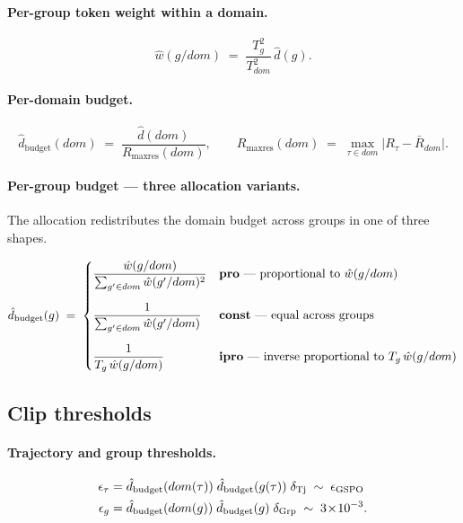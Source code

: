 \documentclass[11pt]{article}
\newcommand{\dbudget}{\hat d_{\text{budget}}}
\begin{document}
\paragraph{Per-group token weight within a domain.}
\[
\hat w(g/dom) \;=\; \frac{T_g^{2}}{T_{dom}^{2}}\,\hat d(g).
\]

\paragraph{Per-domain budget.}
\[
\dbudget(dom) \;=\; \frac{\hat d(dom)}{R_{\max\text{res}}(dom)},
\qquad
R_{\max\text{res}}(dom) \;=\; \max_{\tau\in dom}\bigl|R_\tau - \bar R_{dom}\bigr|.
\]

\paragraph{Per-group budget --- three allocation variants.}
The allocation redistributes the domain budget across groups in one of
three shapes.

\begin{equation}
\dbudget(g) \;=\;
\begin{dcases}
\dfrac{\hat w(g/dom)}{\sum_{g'\in dom}\hat w(g'/dom)^{2}}
  & \text{\textbf{pro} --- proportional to $\hat w(g/dom)$} \\[6pt]
\dfrac{1}{\sum_{g'\in dom}\hat w(g'/dom)}
  & \text{\textbf{const} --- equal across groups} \\[6pt]
\dfrac{1}{T_g\,\hat w(g/dom)}
  & \text{\textbf{ipro} --- inverse proportional to $T_g\,\hat w(g/dom)$}
\end{dcases}
\label{eq:dbudget-g}
\end{equation}

\subsection{Clip thresholds}

\paragraph{Trajectory and group thresholds.}
\begin{align}
\epsilon_\tau &= \dbudget(dom(\tau))\;\dbudget(g(\tau))\;\delta_{\rm Tj}
                    \;\sim\; \epsilon_{\rm GSPO}
                    \label{eq:eps-tau} \\
\epsilon_g    &= \dbudget(dom(g))\;\dbudget(g)\;\delta_{\rm Grp}
                    \;\sim\; 3\!\times\!10^{-3}.
                    \label{eq:eps-g}
\end{align}
\end{document}
